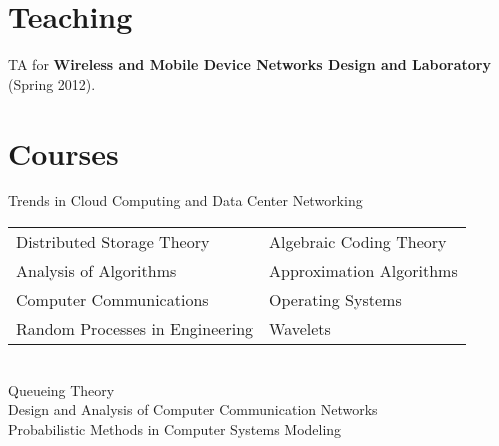 \documentclass[margin,line]{resume}
\begin{document}
\begin{resume}


\section{\mysidestyle Teaching}
TA for \textbf{Wireless and Mobile Device Networks Design and Laboratory} (Spring 2012).

\section{\mysidestyle Courses} 

Trends in Cloud Computing and Data Center Networking\\
\begin{tabular}{@{}p{7cm}p{7cm}}
Distributed Storage Theory & Algebraic Coding Theory \\
Analysis of Algorithms  &  Approximation Algorithms                   \\
Computer Communications  & Operating Systems \\
Random Processes in Engineering  & Wavelets \\
\end{tabular} \\
Queueing Theory \\
Design and Analysis of Computer Communication Networks \\
Probabilistic Methods in Computer Systems Modeling



\end{resume}
\end{document}
